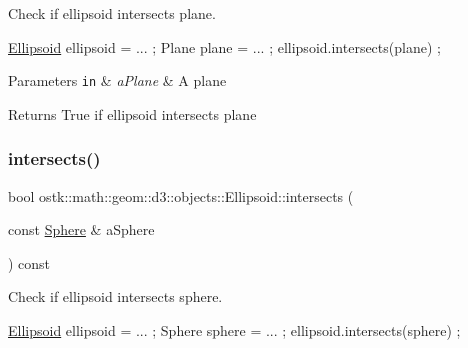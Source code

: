 Check if ellipsoid intersects plane. 


\begin{DoxyCode}
\hyperlink{classostk_1_1math_1_1geom_1_1d3_1_1objects_1_1_ellipsoid_acd84276f65a14db12623402a411712b7}{Ellipsoid} ellipsoid = ... ;
Plane plane = ... ;
ellipsoid.intersects(plane) ;
\end{DoxyCode}



\begin{DoxyParams}[1]{Parameters}
\mbox{\tt in}  & {\em a\+Plane} & A plane \\
\hline
\end{DoxyParams}
\begin{DoxyReturn}{Returns}
True if ellipsoid intersects plane 
\end{DoxyReturn}
\mbox{\label{classostk_1_1math_1_1geom_1_1d3_1_1objects_1_1_ellipsoid_a48ab2b6828f42a314b185709126a0c43}} 
\subsubsection{\texorpdfstring{intersects()}{intersects()}\hspace{0.1cm}{\footnotesize\ttfamily [7/10]}}
{\footnotesize\ttfamily bool ostk\+::math\+::geom\+::d3\+::objects\+::\+Ellipsoid\+::intersects (\begin{DoxyParamCaption}\item[{const \hyperlink{classostk_1_1math_1_1geom_1_1d3_1_1objects_1_1_sphere}{Sphere} \&}]{a\+Sphere }\end{DoxyParamCaption}) const}



Check if ellipsoid intersects sphere. 


\begin{DoxyCode}
\hyperlink{classostk_1_1math_1_1geom_1_1d3_1_1objects_1_1_ellipsoid_acd84276f65a14db12623402a411712b7}{Ellipsoid} ellipsoid = ... ;
Sphere sphere = ... ;
ellipsoid.intersects(sphere) ;
\end{DoxyCode}



